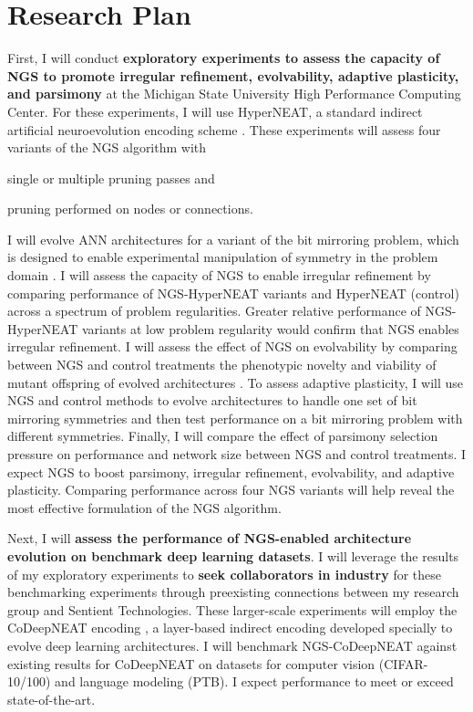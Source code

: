 \section{Research Plan}

First, I will conduct \textbf{exploratory experiments to assess the capacity of NGS to promote irregular refinement, evolvability, adaptive plasticity, and parsimony} at the Michigan State University High Performance Computing Center.
For these experiments, I will use HyperNEAT, a standard indirect artificial neuroevolution encoding scheme \cite{clune2011performance}.
These experiments will assess four variants of the NGS algorithm with
\begin{enumerate*}[label=(\alph*)]
\item single or multiple pruning passes and
\item pruning performed on nodes or connections.
\end{enumerate*}
I will evolve ANN architectures for a variant of the bit mirroring problem, which is designed to enable experimental manipulation of symmetry in the problem domain \cite{clune2011performance}.
I will assess the capacity of NGS to enable irregular refinement by comparing performance of NGS-HyperNEAT variants and HyperNEAT (control) across a spectrum of problem regularities.
Greater relative performance of NGS-HyperNEAT variants at low problem regularity would confirm that NGS enables irregular refinement.
I will assess the effect of NGS on evolvability by comparing between NGS and control treatments the phenotypic novelty and viability of mutant offspring of evolved architectures \cite{tarapore2015evolvability}.
To assess adaptive plasticity, I will use NGS and control methods to evolve architectures to handle one set of bit mirroring symmetries and then test performance on a bit mirroring problem with different symmetries.
Finally, I will compare the effect of parsimony selection pressure on performance and network size between NGS and control treatments.
I expect NGS to boost parsimony, irregular refinement, evolvability, and adaptive plasticity.
Comparing performance across four NGS variants will help reveal the most effective formulation of the NGS algorithm.

Next, I will \textbf{assess the performance of NGS-enabled architecture evolution on benchmark deep learning datasets}.
I will leverage the results of my exploratory experiments to \textbf{seek collaborators in industry} for these benchmarking experiments through preexisting connections between my research group and Sentient Technologies.
These larger-scale experiments will employ the CoDeepNEAT encoding \cite{miikkulainen2017evolving}, a layer-based indirect encoding developed specially to evolve deep learning architectures.
I will benchmark NGS-CoDeepNEAT against existing results for CoDeepNEAT on datasets for computer vision (CIFAR-10/100) and language modeling (PTB).
I expect performance to meet or exceed state-of-the-art.
